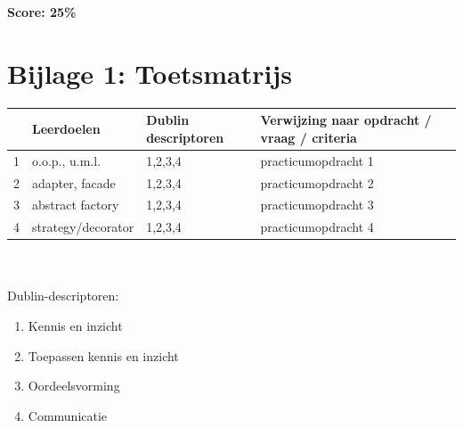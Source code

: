\documentclass[titlepage,a4paper, 11pt]{article}
\begin{document}
\textbf{Score: 25\%}

\newpage
\section{Bijlage 1: Toetsmatrijs}
\begin{tabular}{|p{1cm}|p{4cm}|p{4cm}|p{4cm}|}
\hline
&Leerdoelen&Dublin descriptoren&Verwijzing naar opdracht / vraag / criteria\\
\hline
1&o.o.p., u.m.l.&1,2,3,4&practicumopdracht 1 \\
\hline
2&adapter, facade&1,2,3,4&practicumopdracht 2 \\
\hline
3&abstract factory&1,2,3,4&practicumopdracht 3\\
\hline
4&strategy/decorator&1,2,3,4&practicumopdracht 4\\
\hline
\end{tabular}\\
\vspace{1cm}\\
Dublin-descriptoren:
\begin{enumerate}
\item Kennis en inzicht
\item Toepassen kennis en inzicht
\item Oordeelsvorming
\item Communicatie
\end{enumerate}
\newpage
\end{document}
